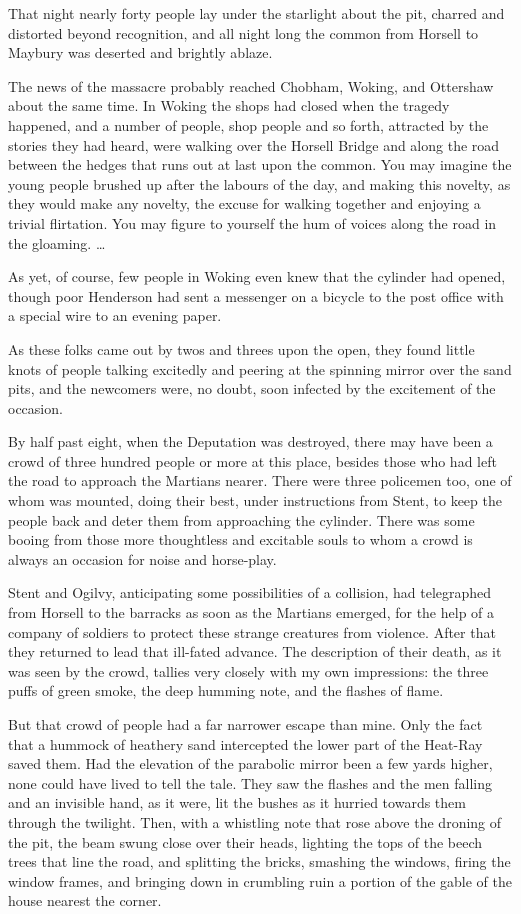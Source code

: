 That night nearly forty people lay under the starlight about the
pit, charred and distorted beyond recognition, and all night long
the common from Horsell to Maybury was deserted and brightly
ablaze.

The news of the massacre probably reached Chobham, Woking, and
Ottershaw about the same time. In Woking the shops had closed when
the tragedy happened, and a number of people, shop people and so
forth, attracted by the stories they had heard, were walking over
the Horsell Bridge and along the road between the hedges that runs
out at last upon the common. You may imagine the young people
brushed up after the labours of the day, and making this novelty,
as they would make any novelty, the excuse for walking together and
enjoying a trivial flirtation. You may figure to yourself the hum
of voices along the road in the gloaming. \ldots{}

As yet, of course, few people in Woking even knew that the cylinder
had opened, though poor Henderson had sent a messenger on a bicycle
to the post office with a special wire to an evening paper.

As these folks came out by twos and threes upon the open, they
found little knots of people talking excitedly and peering at the
spinning mirror over the sand pits, and the newcomers were, no
doubt, soon infected by the excitement of the occasion.

By half past eight, when the Deputation was destroyed, there may
have been a crowd of three hundred people or more at this place,
besides those who had left the road to approach the Martians
nearer. There were three policemen too, one of whom was mounted,
doing their best, under instructions from Stent, to keep the people
back and deter them from approaching the cylinder. There was some
booing from those more thoughtless and excitable souls to whom a
crowd is always an occasion for noise and horse-play.

Stent and Ogilvy, anticipating some possibilities of a collision,
had telegraphed from Horsell to the barracks as soon as the
Martians emerged, for the help of a company of soldiers to protect
these strange creatures from violence. After that they returned to
lead that ill-fated advance. The description of their death, as it
was seen by the crowd, tallies very closely with my own
impressions: the three puffs of green smoke, the deep humming note,
and the flashes of flame.

But that crowd of people had a far narrower escape than mine. Only
the fact that a hummock of heathery sand intercepted the lower part
of the Heat-Ray saved them. Had the elevation of the parabolic
mirror been a few yards higher, none could have lived to tell the
tale. They saw the flashes and the men falling and an invisible
hand, as it were, lit the bushes as it hurried towards them through
the twilight. Then, with a whistling note that rose above the
droning of the pit, the beam swung close over their heads, lighting
the tops of the beech trees that line the road, and splitting the
bricks, smashing the windows, firing the window frames, and
bringing down in crumbling ruin a portion of the gable of the house
nearest the corner.

